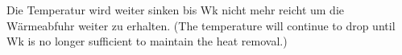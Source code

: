 Die Temperatur wird weiter sinken bis Wk nicht mehr reicht um die Wärmeabfuhr weiter zu erhalten.  
(The temperature will continue to drop until Wk is no longer sufficient to maintain the heat removal.)